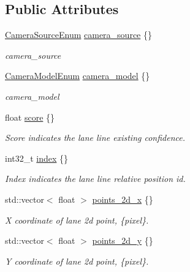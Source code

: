 \subsection*{Public Attributes}
\begin{DoxyCompactItemize}
\item 
\hyperlink{structmaf__perception__interface_1_1CameraSourceEnum}{Camera\+Source\+Enum} \hyperlink{structmaf__perception__interface_1_1Lane_a46d69d28b02fc58192d3065975ca720a}{camera\+\_\+source} \{\}
\begin{DoxyCompactList}\small\item\em camera\+\_\+source \end{DoxyCompactList}\item 
\hyperlink{structmaf__perception__interface_1_1CameraModelEnum}{Camera\+Model\+Enum} \hyperlink{structmaf__perception__interface_1_1Lane_a7f21fa4eb14ad430f6a8ab607a0b2e23}{camera\+\_\+model} \{\}
\begin{DoxyCompactList}\small\item\em camera\+\_\+model \end{DoxyCompactList}\item 
float \hyperlink{structmaf__perception__interface_1_1Lane_a5b1aa167d14b50e074a6a8f95c812948}{score} \{\}
\begin{DoxyCompactList}\small\item\em Score indicates the lane line existing confidence. \end{DoxyCompactList}\item 
int32\+\_\+t \hyperlink{structmaf__perception__interface_1_1Lane_a1a58a3a726bd25eab062c5ed7de74c5e}{index} \{\}
\begin{DoxyCompactList}\small\item\em Index indicates the lane line relative position id. \end{DoxyCompactList}\item 
std\+::vector$<$ float $>$ \hyperlink{structmaf__perception__interface_1_1Lane_a73f1548b7b4d370d766fda3dc7b06348}{points\+\_\+2d\+\_\+x} \{\}
\begin{DoxyCompactList}\small\item\em X coordinate of lane 2d point, \{pixel\}. \end{DoxyCompactList}\item 
std\+::vector$<$ float $>$ \hyperlink{structmaf__perception__interface_1_1Lane_a089e122380b4203eb215760a04f08e85}{points\+\_\+2d\+\_\+y} \{\}
\begin{DoxyCompactList}\small\item\em Y coordinate of lane 2d point, \{pixel\}. \end{DoxyCompactList}\item 

\end{DoxyCompactItemize}
